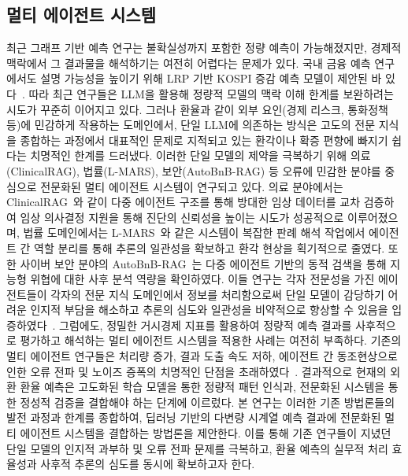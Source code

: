 \subsection{멀티 에이전트 시스템}
최근 그래프 기반 예측 연구는 불확실성까지 포함한 정량 예측이 가능해졌지만, 경제적 맥락에서 그 결과물을 해석하기는 여전히 어렵다는 문제가 있다. 국내 금융 예측 연구에서도 설명 가능성을 높이기 위해 LRP 기반 KOSPI 증감 예측 모델이 제안된 바 있다~\cite{Lee2021KOSPILRP}. 따라 최근 연구들은 LLM을 활용해 정량적 모델의 맥락 이해 한계를 보완하려는 시도가 꾸준히 이어지고 있다. 그러나 환율과 같이 외부 요인(경제 리스크, 통화정책 등)에 민감하게 작용하는 도메인에서, 단일 LLM에 의존하는 방식은 고도의 전문 지식을 종합하는 과정에서 대표적인 문제로 지적되고 있는 환각이나 확증 편향에 빠지기 쉽다는 치명적인 한계를 드러냈다.
이러한 단일 모델의 제약을 극복하기 위해 의료(ClinicalRAG), 법률(L-MARS), 보안(AutoBnB-RAG) 등 오류에 민감한 분야를 중심으로 전문화된 멀티 에이전트 시스템이 연구되고 있다. 의료 분야에서는 ClinicalRAG~\cite{ClinicalRAG2024}와 같이 다중 에이전트 구조를 통해 방대한 임상 데이터를 교차 검증하여 임상 의사결정 지원을 통해 진단의 신뢰성을 높이는 시도가 성공적으로 이루어졌으며, 법률 도메인에서는 L-MARS~\cite{Wang2025LMARS}와 같은 시스템이 복잡한 판례 해석 작업에서 에이전트 간 역할 분리를 통해 추론의 일관성을 확보하고 환각 현상을 획기적으로 줄였다. 또한 사이버 보안 분야의 AutoBnB-RAG~\cite{Liu2025AutoBnBRAG}는 다중 에이전트 기반의 동적 검색을 통해 지능형 위협에 대한 사후 분석 역량을 확인하였다. 이들 연구는 각자 전문성을 가진 에이전트들이 각자의 전문 지식 도메인에서 정보를 처리함으로써 단일 모델이 감당하기 어려운 인지적 부담을 해소하고 추론의 심도와 일관성을 비약적으로 향상할 수 있음을 입증하였다~\cite{Wu2023AutoGen}. 
그럼에도, 정밀한 거시경제 지표를 활용하여 정량적 예측 결과를 사후적으로 평가하고 해석하는 멀티 에이전트 시스템을 적용한 사례는 여전히 부족하다. 기존의 멀티 에이전트 연구들은 처리량 증가, 결과 도출 속도 저하, 에이전트 간 동조현상으로 인한 오류 전파 및 노이즈 증폭의 치명적인 단점을 초래하였다~\cite{Cui2025FreeMAD}. 결과적으로 현재의 외환 환율 예측은 고도화된 학습 모델을 통한 정량적 패턴 인식과, 전문화된 시스템을 통한 정성적 검증을 결합해야 하는 단계에 이르렀다. 본 연구는 이러한 기존 방법론들의 발전 과정과 한계를 종합하여, 딥러닝 기반의 다변량 시계열 예측 결과에 전문화된 멀티 에이전트 시스템을 결합하는 방법론을 제안한다. 이를 통해 기존 연구들이 지녔던 단일 모델의 인지적 과부하 및 오류 전파 문제를 극복하고, 환율 예측의 실무적 처리 효율성과 사후적 추론의 심도를 동시에 확보하고자 한다.
